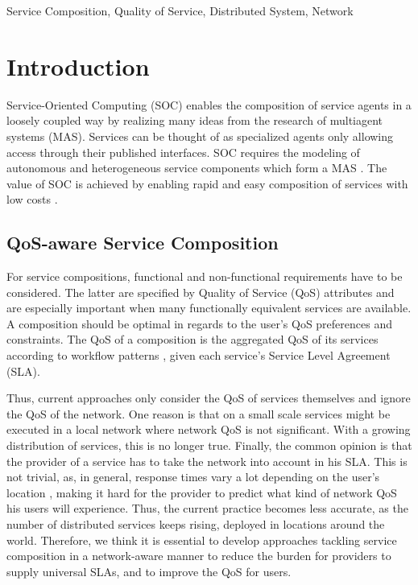 \documentclass[10pt, conference, compsocconf]{IEEEtran}
\begin{document}
\begin{IEEEkeywords}
Service Composition, Quality of Service, Distributed System, Network
\end{IEEEkeywords}

\IEEEpeerreviewmaketitle

\section{Introduction}
\noindent Service-Oriented Computing (SOC) enables the composition of service agents
	in a loosely coupled way by realizing many ideas from the research of multiagent systems (MAS).
Services can be thought of as specialized agents only allowing access through their published interfaces.
SOC requires the modeling of autonomous and heterogeneous service components which form a MAS \cite{Huhns2005}.
The value of SOC is achieved by enabling rapid and easy composition of services with low costs \cite{Papazoglou2003}.

\subsection{QoS-aware Service Composition}
\noindent For service compositions, functional and non-functional requirements \cite{Sullivan2002} have to be considered.
The latter are specified by Quality of Service (QoS) attributes and are especially important
	when many functionally equivalent services are available.
A composition should be optimal in regards to the user's QoS preferences and constraints.
The QoS of a composition is the aggregated QoS of its services according to workflow patterns \cite{Jaeger2004},
	given each service's Service Level Agreement (SLA).

\noindent Thus, current approaches only consider the QoS of services themselves and ignore the QoS of the network.
One reason is that on a small scale services might be executed in a local network
	where network QoS is not significant.
With a growing distribution of services, this is no longer true.
Finally, the common opinion is that the provider of a service has to take the network into account in his SLA.
This is not trivial, as, in general, response times vary a lot depending on the user's location \cite{Zheng2010},
	making it hard for the provider to predict what kind of network QoS his users will experience.
Thus, the current practice becomes less accurate,
	as the number of distributed services keeps rising, deployed in locations around the world.
Therefore, we think it is essential to develop approaches tackling service composition in a network-aware manner
	to reduce the burden for providers to supply universal SLAs, and to improve the QoS for users.
  
\end{document}
